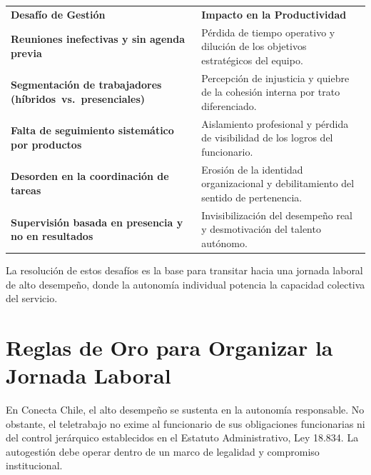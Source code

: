 \documentclass[11pt,letterpaper]{article}
\begin{document}
\begin{tabularx}{\textwidth}{L{0.36\textwidth} Y}
\color{BlancoIndustrial}\textbf{Desafío de Gestión} & \color{BlancoIndustrial}\textbf{Impacto en la Productividad} \\
\textbf{Reuniones inefectivas y sin agenda previa} & Pérdida de tiempo operativo y dilución de los objetivos estratégicos del equipo. \\
\textbf{Segmentación de trabajadores \mbox{(híbridos vs. presenciales)}} & Percepción de injusticia y quiebre de la cohesión interna por trato diferenciado. \\
\textbf{Falta de seguimiento sistemático por productos} & Aislamiento profesional y pérdida de visibilidad de los logros del funcionario. \\
\textbf{Desorden en la coordinación de tareas} & Erosión de la identidad organizacional y debilitamiento del sentido de pertenencia. \\
\textbf{Supervisión basada en presencia y no en resultados} & Invisibilización del desempeño real y desmotivación del talento autónomo. \\
\end{tabularx}

La resolución de estos desafíos es la base para transitar hacia una jornada laboral de alto desempeño, donde la autonomía individual potencia la capacidad colectiva del servicio.

\section{Reglas de Oro para Organizar la Jornada Laboral}

En Conecta Chile, el alto desempeño se sustenta en la autonomía responsable. No obstante, el teletrabajo no exime al funcionario de sus obligaciones funcionarias ni del control jerárquico establecidos en el Estatuto Administrativo, Ley 18.834. La autogestión debe operar dentro de un marco de legalidad y compromiso institucional.
\end{document}
